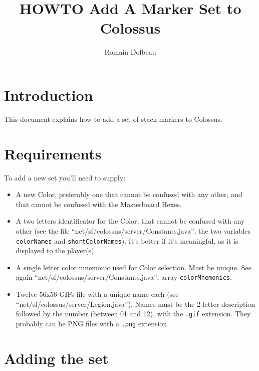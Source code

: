 \documentclass{article}
\begin{document}

\title{HOWTO Add A Marker Set to Colossus}

\author{Romain Dolbeau}

\maketitle

\section{Introduction}

This document explains how to add a set of stack markers to Colossus.

\section{Requirements}

To add a new set you'll need to supply:

\begin{itemize}

\item A new Color, preferably one that cannot be confused with any other, and that cannot be confused with the Masterboard Hexes.

\item A two letters identificator for the Color, that cannot be confused with any other (see the file ``net/sf/colossus/server/Constants.java'', the two variables \texttt{colorNames} and \texttt{shortColorNames}). It's better if it's meaningful, as it is displayed to the player(s).

\item A single letter color mnemonic used for Color selection. Must be unique. See again ``net/sf/colossus/server/Constants.java'', array \texttt{colorMnemonics}.

\item Twelve 56x56 GIFs file with a unique name each (see ``net/sf/colossus/server/Legion.java''). Names must be the 2-letter description followed by the number (between 01 and 12), with the \texttt{.gif} extension. They probably can be PNG files with a \texttt{.png} extension.

\end{itemize}

\section{Adding the set}
\end{document}
